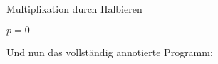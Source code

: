 \begin{algorithm}[H]
	\caption{Multiplikation durch Halbieren}
	\label{algo:multiplikation_durch_halbieren_1}
	
	\vspace{\baselineskip}
	
	
	\vspace{\baselineskip}
	
	$p = 0$\;
	
	\vspace{\baselineskip}
	
	\;
	
	\vspace{\baselineskip}
	
	
	\vspace{\baselineskip}
	
\end{algorithm}

\vspace{\baselineskip}
\vspace{\baselineskip} %

Und nun das vollständig annotierte Programm:

\pagebreak %

